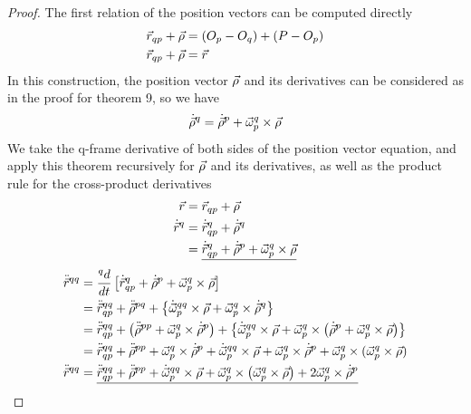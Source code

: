 \documentclass{article}
\begin{document}
\begin{proof}
    The first relation of the position vectors can be computed directly
    \begin{align*}
        \vec{r}_{qp} + \vec{\rho} &= (O_p-O_q) + (P-O_p) \\
        \vec{r}_{qp} + \vec{\rho} &= \vec{r}\\
    \end{align*}
    In this construction, the position vector $\vec{\rho}$ and its derivatives can be considered as in the proof for theorem 9, so we have
    $$\dot{\vec{\rho}}^q = \dot{\vec{\rho}}^p + \vec{\omega}_p^q\times\vec{\rho}$$
    We take the q-frame derivative of both sides of the position vector equation, and apply this theorem recursively for $\vec{\rho}$ and its derivatives, as well as the product rule for the cross-product derivatives
    \begin{align*}
        \vec{r} &= \vec{r}_{qp} + \vec{\rho}  \\
        \dot{\vec{r}}^q &= \dot{\vec{r}}_{qp}^q + \dot{\vec{\rho}}^q \\
        &= \underline{\dot{\vec{r}}_{qp}^q + \dot{\vec{\rho}}^p + \vec{\omega}_p^q\times\vec{\rho}}\\
    \end{align*}
    \begin{align*}
        \ddot{\vec{r}}^{qq} &= \frac{{}^qd}{dt}\left[ \dot{\vec{r}}_{qp}^q + \dot{\vec{\rho}}^p + \vec{\omega}_p^q\times\vec{\rho} \right]\\
        &= \ddot{\vec{r}}_{qp}^{qq} + \ddot{\vec{\rho}}^{pq} +\left\{\dot{\vec{\omega}}_p^{qq}\times\vec{\rho}+\vec{\omega}_p^q\times\dot{\vec{\rho}}^q\right\}\\
        &= \ddot{\vec{r}}_{qp}^{qq} + \left(\ddot{\vec{\rho}}^{pp}+\vec{\omega}_p^q\times\dot{\vec{\rho}}^p\right) + \left\{ \dot{\vec{\omega}}_p^{qq}\times\vec{\rho} + \vec{\omega}_p^q \times \left(\dot{\vec{\rho}}^p + \vec{\omega}_p^q\times\vec{\rho}\right)\right\}\\
        &=\ddot{\vec{r}}_{qp}^{qq} + \ddot{\vec{\rho}}^{pp}+\vec{\omega}_p^q\times\dot{\vec{\rho}}^p + \dot{\vec{\omega}}_p^{qq}\times\vec{\rho} + \vec{\omega}_p^q\times\dot{\vec{\rho}}^p + \vec{\omega}_p^q\times(\vec{\omega}_p^q\times\vec{\rho}) \\
        \ddot{\vec{r}}^{qq}&= \underline{\ddot{\vec{r}}_{qp}^{qq} + \ddot{\vec{\rho}}^{pp} + \dot{\vec{\omega}}_p^{qq}\times\vec{\rho} + \vec{\omega}_p^q\times \left(\vec{\omega}_p^q\times\vec{\rho}\right)+2\vec{\omega}_p^q\times \dot{\vec{\rho}}^p}
    \end{align*}
\end{proof}
\end{document}
